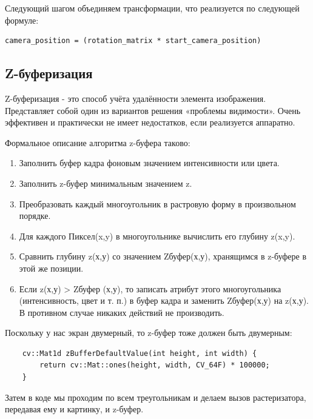 \documentclass[14pt,a4paper,report]{report}
\begin{document}
Следующий шагом  объединяем трансформации, что реализуется по следующей формуле:
\begin{lstlisting}
camera_position = (rotation_matrix * start_camera_position)
\end{lstlisting}


\subsection{Z-буферизация}
Z-буферизация - это способ учёта удалённости элемента изображения. Представляет собой один из вариантов решения «проблемы видимости». Очень эффективен и практически не имеет недостатков, если реализуется аппаратно. 

Формальное описание алгоритма z-буфера таково:
\begin{enumerate}

\item Заполнить буфер кадра фоновым значением интенсивности или цвета.
\item  Заполнить z-буфер минимальным значением z.
\item  Преобразовать каждый многоугольник в растровую форму в произвольном порядке.
\item Для каждого Пиксел(x,y) в многоугольнике вычислить его глубину z(x,y).
\item Сравнить глубину z(х,у) со значением Zбуфер(х,у), хранящимся в z-буфере в этой же позиции.
\item Если z(х,у) > Zбуфер (х,у), то записать атрибут этого многоугольника (интенсивность, цвет и т. п.) в буфер кадра и заменить Zбуфер(х,у) на z(х,у). В противном случае никаких действий не производить.
\end{enumerate}


Поскольку у нас экран двумерный, то z-буфер тоже должен быть двумерным:
 \begin{lstlisting}
    cv::Mat1d zBufferDefaultValue(int height, int width) {
        return cv::Mat::ones(height, width, CV_64F) * 100000;
    }
 \end{lstlisting}
 
Затем в коде мы проходим по всем треугольникам и делаем вызов растеризатора, передавая ему и картинку, и z-буфер.
\end{document}
